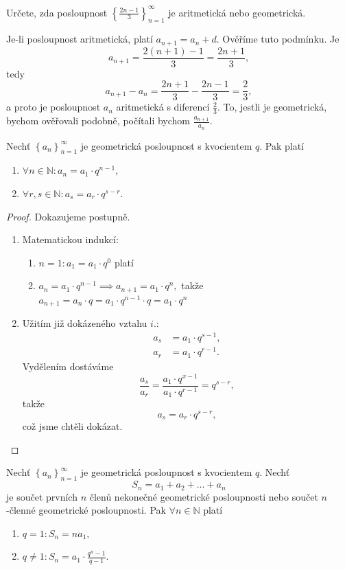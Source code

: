 \begin{priklad}
Určete, zda posloupnost $\left \{ \frac{2n-1}{3} \right \}_{n=1}^\infty $ je aritmetická nebo geometrická.
\end{priklad}

\begin{reseni}
Je-li posloupnost aritmetická, platí $a_{n+1} = a_n + d$. Ověříme tuto podmínku. Je
$$
    a_{n+1} = \frac{2(n+1)-1}{3} = \frac{2n+1}{3},
$$
tedy
$$
    a_{n+1}-a_n = \frac{2n+1}{3}-\frac{2n-1}{3}=\frac{2}{3},
$$
a proto je posloupnost $a_n$ aritmetická s diferencí $\frac{2}{3}$. To, jestli je geometrická, bychom ověřovali podobně,
počítali bychom $\frac{a_{n+1}}{a_n}$.
\end{reseni}

\begin{veta}
    Nechť $\left \{ a_n \right \}_{n=1}^\infty $ je geometrická posloupnost s kvocientem
    $q$. Pak platí
    \begin{enumerate}[$i.$]
    \item $\forall n\in \mathbb N\colon a_n = a_1 \cdot q^{n-1},$
   	\item $\forall r,s \in \mathbb N\colon a_s = a_r \cdot q^{s-r}.$
    \end{enumerate}
\end{veta}

\begin{proof} Dokazujeme postupně.
\begin{enumerate}[$i.$]
\item Matematickou indukcí:
\begin{enumerate}[1.]
\item $n=1\colon a_1 = a_1\cdot q^0$ platí
\item $a_n = a_1\cdot q^{n-1}\implies a_{n+1}=a_1\cdot q^n,$ takže $a_{n+1}=a_n\cdot q=a_1\cdot q^{n-1}\cdot q=a_1\cdot q^n$
\end{enumerate}
\item Užitím již dokázeného vztahu $i.$:
\begin{align*}
    a_s &= a_1\cdot q^{s-1},\\
    a_r &= a_1\cdot q^{r-1}.
\end{align*}
Vydělením dostáváme
$$\frac{a_s}{a_r} = \frac{a_1\cdot q^{x-1}}{a_1\cdot q^{r-1}}=q^{s-r},$$
takže
$$a_s=a_r\cdot q^{s-r},$$
což jsme chtěli dokázat.\qedhere
\end{enumerate}
\end{proof}

\begin{veta}
Nechť $\left \{ a_n \right \}_{n=1}^\infty $ je geometrická posloupnost s kvocientem
$q$. Nechť
$$S_n=a_1+a_2+\dots+a_n$$
je součet prvních $n$ členů nekonečné geometrické posloupnosti nebo součet
$n$-členné geometrické posloupnosti. Pak $\forall n \in \mathbb N$ platí
\begin{enumerate}[$i.$]
\item $q=1\colon S_n=na_1,$
\item $q\ne 1\colon S_n = a_1\cdot \frac{q^n-1}{q-1}.$
\end{enumerate}
\end{veta}

